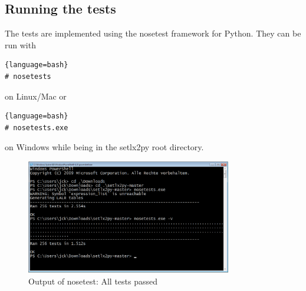 \subsection{Running the tests}

The tests are implemented using the nosetest framework for Python. They can be run with

\begin{lstlisting}{language=bash}
# nosetests 
\end{lstlisting}

on Linux/Mac or 

\begin{lstlisting}{language=bash}
# nosetests.exe
\end{lstlisting}

on Windows while being in the setlx2py root directory.

\begin{figure}[htb]
	\centering
	\includegraphics[width=0.8\textwidth]{img/run-nose.png}
	\caption{Output of nosetest: All tests passed}

\end{figure}